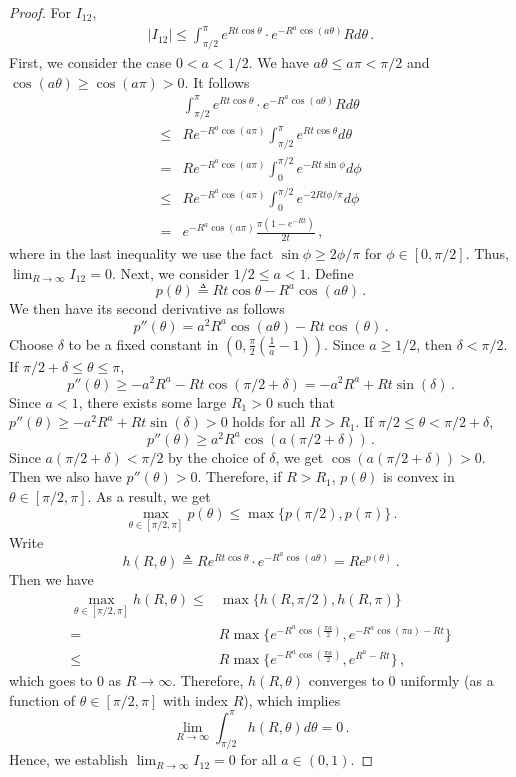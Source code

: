 \documentclass[11pt]{article}
\begin{document}
\begin{proof}
For $I_{12}$,
\begin{align*}
    |I_{12}|\leq \int_{\pi/2}^{\pi} e^{Rt\cos\theta}\cdot e^{-R^a \cos(a\theta)} R d\theta\,.
\end{align*}
First, we consider the case $0<a<1/2$. We have $a\theta \le a\pi < \pi/2$ and $\cos(a\theta) \ge \cos(a\pi) > 0$. It follows
\begin{align*}
& \int_{\pi/2}^{\pi} e^{Rt\cos\theta}\cdot e^{-R^a \cos(a\theta)} R d\theta\\
\le{}& R e^{-R^a \cos(a\pi)} \int_{\pi/2}^{\pi} e^{Rt\cos\theta}  d\theta\\
={}& R e^{-R^a \cos(a\pi)} \int_{0}^{\pi/2} e^{-Rt\sin \phi}  d\phi\\
\le{}& R e^{-R^a \cos(a\pi)} \int_{0}^{\pi/2} e^{-2Rt \phi/\pi}  d\phi\\
={}&  e^{-R^a \cos(a\pi)}\frac{\pi(1 -  e^{-R t})}{2  t}\,,
\end{align*}
where in the last inequality we use the fact $\sin\phi \ge 2\phi/\pi$ for $\phi\in [0,\pi/2]$. Thus, $\lim_{R\to\infty} I_{12}=0$. Next, we consider $1/2\le a< 1$. Define \[p(\theta)\triangleq Rt\cos\theta-R^a \cos(a\theta)\,.\] We then have its second derivative as follows \[p''(\theta) = a^2 R^a \cos (a \theta )-R t \cos (\theta )\,.\] 
Choose $\delta$ to be a fixed constant in $(0,\frac{\pi}{2}(\frac{1}{a}-1))$.
Since $a\ge 1/2$, then $\delta < \pi/2$.
If $\pi/2+\delta \le \theta \le \pi$,
\[
p''(\theta) \ge -a^2 R^a - R t \cos(\pi/2+\delta)
=  -a^2 R^a + R t \sin(\delta)\,.
\]
Since $a<1$, there exists some large $R_1>0$ such that $p''(\theta)\ge -a^2 R^a + R t \sin(\delta)>0$ holds for all $R>R_1$. 
If $\pi/2\le \theta < \pi/2 + \delta$,
\[
p''(\theta) \ge a^2 R^a \cos(a(\pi/2+\delta))\,.
\] 
Since $a(\pi/2+\delta) < \pi/2$ by the choice of $\delta$, we get $\cos(a(\pi/2+\delta))>0$. Then we also have $p''(\theta)>0$. Therefore, if $R>R_1$, $p(\theta)$ is convex in $\theta\in [\pi/2,\pi]$. As a result, we get \[
\max_{\theta\in [\pi/2,\pi]} p(\theta) \le \max \{ p(\pi/2),p(\pi) \}\,.
\]
Write \[h(R,\theta)\triangleq R e^{Rt\cos\theta}\cdot e^{-R^a \cos(a\theta)}
= R e^{p(\theta)}\,.\]
Then we have \begin{align*}
\max_{\theta\in [\pi/2,\pi]} h(R,\theta) \le{}& \max\{ h(R,\pi/2),h(R,\pi) \}\\ 
={}& R \max\{ e^{-R^a \cos \left(\frac{\pi  a}{2}\right)},  e^{-R^a \cos (\pi  a)-R t}\}\\
\le{}& R \max\{ e^{-R^a \cos \left(\frac{\pi  a}{2}\right)},  e^{R^a -R t}\} \,,
\end{align*}
which goes to $0$ as $R\to\infty$.
Therefore, $h(R,\theta)$ converges to $0$ uniformly (as a function of $\theta\in [\pi/2,\pi]$ with index $R$), which implies
\[\lim_{R\to \infty} \int_{\pi/2}^{\pi} h(R,\theta) d\theta = 0\,.\] 
Hence, we establish $\lim_{R\to \infty} I_{12}=0$ for all $a\in(0,1)$. 


\end{proof}
\end{document}
